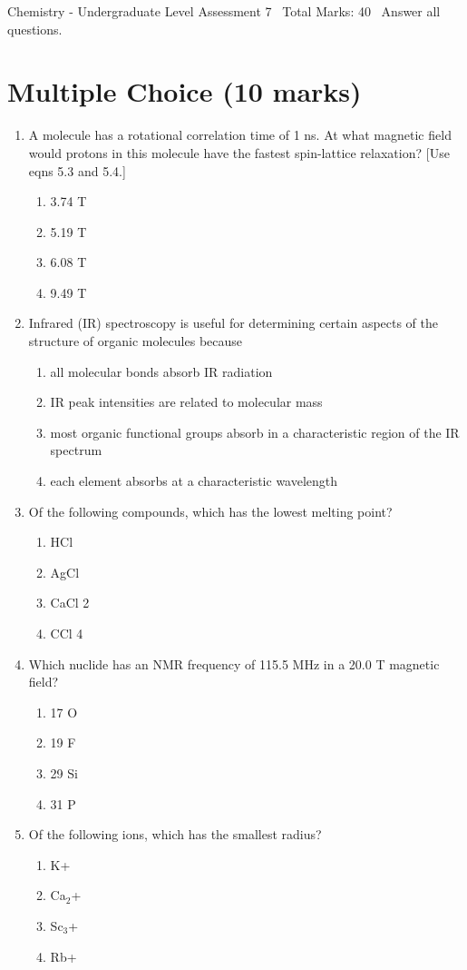 \documentclass[12pt]{article}
\begin{document}
\begin{center}
Chemistry - Undergraduate Level Assessment 7 \
Total Marks: 40 \
Answer all questions.
\end{center}

\section*{Multiple Choice (10 marks)}
\begin{enumerate}[label=\arabic*.]
\item A molecule has a rotational correlation time of 1 ns. At what magnetic field would protons in this molecule have the fastest spin-lattice relaxation? [Use eqns 5.3 and 5.4.]
\begin{enumerate}[label=(\alph*)]
    \item 3.74 T
    \item 5.19 T
    \item 6.08 T
    \item 9.49 T
\end{enumerate}
\item Infrared (IR) spectroscopy is useful for determining certain aspects of the structure of organic molecules because
\begin{enumerate}[label=(\alph*)]
    \item all molecular bonds absorb IR radiation
    \item IR peak intensities are related to molecular mass
    \item most organic functional groups absorb in a characteristic region of the IR spectrum
    \item each element absorbs at a characteristic wavelength
\end{enumerate}
\item Of the following compounds, which has the lowest melting point?
\begin{enumerate}[label=(\alph*)]
    \item HCl
    \item AgCl
    \item CaCl 2
    \item CCl 4
\end{enumerate}
\item Which nuclide has an NMR frequency of 115.5 MHz in a 20.0 T magnetic field?
\begin{enumerate}[label=(\alph*)]
    \item 17 O
    \item 19 F
    \item 29 Si
    \item 31 P
\end{enumerate}
\item Of the following ions, which has the smallest radius?
\begin{enumerate}[label=(\alph*)]
    \item K+
    \item Ca$_{2}$+
    \item Sc$_{3}$+
    \item Rb+
\end{enumerate}
\end{enumerate}
\end{document}
